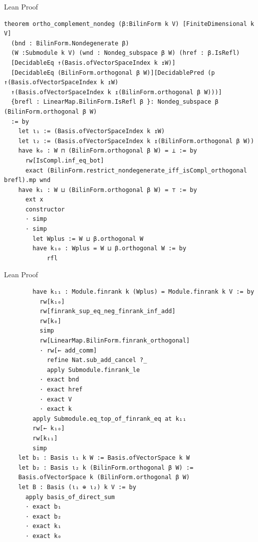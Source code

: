 \documentclass[svgnames]{beamer}
\begin{document}
\begin{frame}[label={sec:orthog_compl},fragile]{Lean Proof}

{\tiny
\begin{verbatim}
theorem ortho_complement_nondeg (β:BilinForm k V) [FiniteDimensional k V]
  (bnd : BilinForm.Nondegenerate β)
  (W :Submodule k V) (wnd : Nondeg_subspace β W) (href : β.IsRefl)
  [DecidableEq ↑(Basis.ofVectorSpaceIndex k ↥W)] 
  [DecidableEq (BilinForm.orthogonal β W)][DecidablePred (p ↑(Basis.ofVectorSpaceIndex k ↥W) 
  ↑(Basis.ofVectorSpaceIndex k ↥(BilinForm.orthogonal β W)))]
  {brefl : LinearMap.BilinForm.IsRefl β }: Nondeg_subspace β (BilinForm.orthogonal β W) 
  := by
    let ι₁ := (Basis.ofVectorSpaceIndex k ↥W)
    let ι₂ := (Basis.ofVectorSpaceIndex k ↥(BilinForm.orthogonal β W))
    have k₀ : W ⊓ (BilinForm.orthogonal β W) = ⊥ := by
      rw[IsCompl.inf_eq_bot]
      exact (BilinForm.restrict_nondegenerate_iff_isCompl_orthogonal brefl).mp wnd
    have k₁ : W ⊔ (BilinForm.orthogonal β W) = ⊤ := by
      ext x
      constructor
      · simp
      · simp
        let Wplus := W ⊔ β.orthogonal W
        have k₁₀ : Wplus = W ⊔ β.orthogonal W := by
            rfl
\end{verbatim}
}
\end{frame}

\begin{frame}[label={sec:orthog_compl},fragile]{Lean Proof}

{\tiny
\begin{verbatim}
        have k₁₁ : Module.finrank k (Wplus) = Module.finrank k V := by
          rw[k₁₀]
          rw[finrank_sup_eq_neg_finrank_inf_add]
          rw[k₀]
          simp
          rw[LinearMap.BilinForm.finrank_orthogonal]
          · rw[← add_comm]
            refine Nat.sub_add_cancel ?_
            apply Submodule.finrank_le
          · exact bnd
          · exact href
          · exact V
          · exact k
        apply Submodule.eq_top_of_finrank_eq at k₁₁
        rw[← k₁₀]
        rw[k₁₁]
        simp
    let b₁ : Basis ι₁ k W := Basis.ofVectorSpace k W
    let b₂ : Basis ι₂ k (BilinForm.orthogonal β W) := 
    Basis.ofVectorSpace k (BilinForm.orthogonal β W)
    let B : Basis (ι₁ ⊕ ι₂) k V := by
      apply basis_of_direct_sum
      · exact b₁
      · exact b₂
      · exact k₁
      · exact k₀
\end{verbatim}
}
\end{frame}
\end{document}
